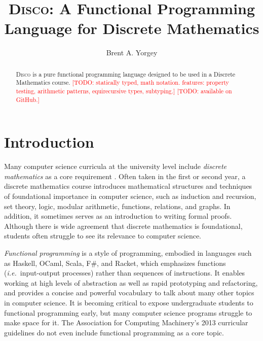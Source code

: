 \documentclass[submission,copyright,creativecommons]{eptcs}
\title{\textsc{Disco}: A Functional Programming Language for Discrete Mathematics}
\author{Brent A. Yorgey
\institute{Hendrix College\\ Conway, Arkansas, USA}
\email{yorgey@hendrix.edu}
}
\newcommand{\disco}{\textsc{Disco}\xspace}
\newcommand{\ie}{\emph{i.e.}\ }
\newcommand{\todo}[1]{\textcolor{red}{[TODO: #1]}}
\newcommand{\todo}[1]{}
\begin{document}
\maketitle

\begin{abstract}
  \disco is a pure functional programming language designed to be used
  in a Discrete Mathematics course. \todo{statically typed, math
  notation. features: property testing, arithmetic patterns, equirecursive
  types, subtyping.}
  \todo{available on GitHub.}
\end{abstract}

\section{Introduction}
\label{sec:introduction}

Many computer science curricula at the university level include
\emph{discrete mathematics} as a core requirement \cite{ACM:2013}.
Often taken in the first or second year, a discrete mathematics course
introduces mathematical structures and techniques of foundational
importance in computer science, such as induction and recursion, set
theory, logic, modular arithmetic, functions, relations, and graphs.
In addition, it sometimes serves as an introduction to writing formal
proofs.  Although there is wide agreement that discrete mathematics is
foundational, students often struggle to see its relevance to
computer science.

\emph{Functional programming} is a style of programming, embodied in
languages such as Haskell, OCaml, Scala, F\#, and Racket, which
emphasizes functions (\ie input-output processes) rather than
sequences of instructions. It enables working at high levels of
abstraction as well as rapid prototyping and refactoring, and provides
a concise and powerful vocabulary to talk about many other topics in
computer science.  It is becoming critical to expose undergraduate
students to functional programming early, but many computer science
programs struggle to make space for it.  The Association for Computing
Machinery's 2013 curricular guidelines \cite{ACM:2013} do not even
include functional programming as a core topic.
\end{document}

